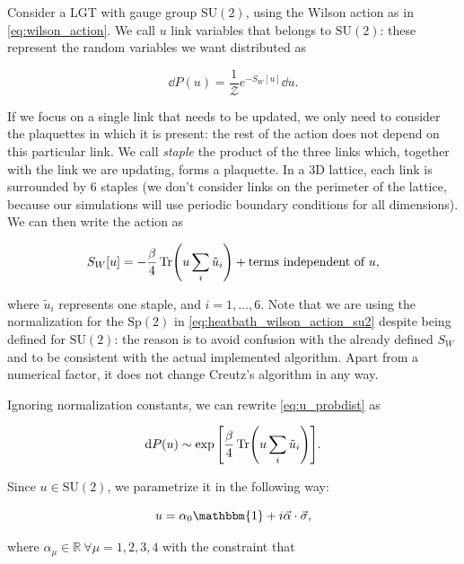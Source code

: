\documentclass[reqno,12pt]{article}
\numberwithin{equation}{section}
\newcommand{\Z}{\mathcal{Z}}
\newcommand{\SU}{\mathrm{SU}}
\newcommand{\Sp}{\mathrm{Sp}}
\newcommand{\id}{\mathbbm{1}}
\begin{document}
Consider a LGT with gauge group $\SU(2)$, using the Wilson action as in \eqref{eq:wilson_action}. We call $u$
link variables that belongs to $\SU(2)$: these represent the random variables we want distributed as

\begin{equation} \label{eq:u_probdist}
	\dd{P(u)} = \frac{1}{\Z} e^{-S_W[u]} \dd{u}.
\end{equation}

If we focus on a single link that needs to be updated, we only need to consider the plaquettes in which it is
present: the rest of the action does not depend on this particular link. We call \textit{staple} the product
of the three links which, together with the link we are updating, forms a plaquette. In a 3D lattice, each link
is surrounded by 6 staples (we don't consider links on the perimeter of the lattice, because our simulations will 
use periodic boundary conditions for all dimensions). We can then write the action as

\begin{equation} \label{eq:heatbath_wilson_action_su2}
	S_W[u] = -\frac{\beta}{4} \Tr(u \sum_i \tilde{u}_i) + \text{terms independent of } u,
\end{equation}

where $\tilde{u}_i$ represents one staple, and $i = 1, \dots, 6$. Note that we are
using the normalization for the $\Sp(2)$ in \eqref{eq:heatbath_wilson_action_su2} despite being defined for
$\SU(2)$: the reason is to avoid confusion with the already defined $S_W$ and to be consistent with the actual implemented
algorithm. Apart from a numerical factor, it does not change Creutz's algorithm in any way. 

Ignoring normalization constants, we can rewrite \eqref{eq:u_probdist} as

\begin{equation} \label{eq:u_probdist_2}
	\dd{P(u)} \sim \exp\qty[\frac{\beta}{4} \Tr(u \sum_i \tilde{u}_i)].
\end{equation}

Since $u \in \SU(2)$, we parametrize it in the following way:

\begin{equation} \label{eq:su2parametrization}
	u = \alpha_0 \id + i \va{\alpha} \cdot \va{\sigma},
\end{equation}

where $\alpha_\mu \in \mathbb{R} \ \forall \mu = 1, 2, 3, 4$ with the constraint that 
\end{document}
